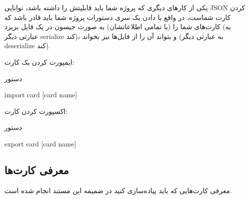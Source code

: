 \documentclass[]{article}
\begin{document}
یکی از کارهای دیگری که پروژه شما باید قابلیتش را داشته باشد، توانایی JSON کردن کارت شماست، در واقع با دادن یک سری دستورات پروژه شما باید قادر باشد که کارت‌های شما را (با تمامی اطلاعاتشان) به صورت جیسون در یک فایل بریزد (به عبارتی دیگر serialize کند)، و بتواند آن را از فایل‌ها نیز بخواند (به عبارتی دیگر deserialize کند).

ایمپورت کردن یک کارت:

\begin{mybox}[colback=yellow]{دستور}
	\begin{latin}	
		import card [card name]
	\end{latin}
\end{mybox}

اکسپورت کردن کارت:
\begin{mybox}[colback=yellow]{دستور}
	\begin{latin}	
		export card [card name]
		
	\end{latin}
\end{mybox}

\subsection*{{\titr معرفی کارت‌ها }}

معرفی کارت‌هایی که باید پیاده‌سازی کنید در ضمیمه این مستند انجام شده است.
\end{document}
